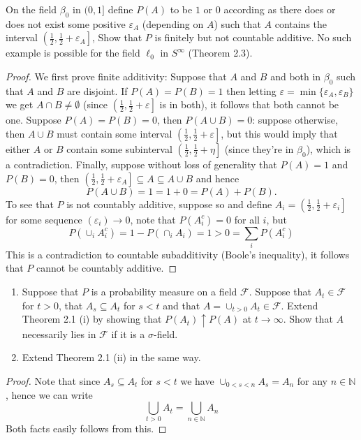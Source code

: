 \documentclass[11pt]{article}
\newcommand{\N}{\mathbb{N}}
\newcommand{\F}{\mathcal{F}}
\newcommand{\B}{\beta}
\newcommand{\seq}{\subseteq}
\newcommand{\e}{\varepsilon}
\newcommand{\es}{\emptyset}
\newcommand{\mc}{\mathcal}
\newcommand{\un}{\cup}
\newcommand{\ic}{\cap}
\newenvironment{exercise}[2][Exercise]{\begin{trivlist}
\item[\hskip \labelsep {\bfseries #1}\hskip \labelsep {\bfseries #2.}]}{\end{trivlist}}
\begin{document}
\begin{exercise}{2.15}
    On the field $\B_0$ in $(0, 1]$ define $P(A)$ to be $1$ or $0$ according as there does or does not exist some positive $\e_A$ (depending on $A$) such that $A$ contains the interval $\left ( \frac{1}{2}, \frac{1}{2} + \e_A \right ]$, Show that $P$ is finitely but not countable additive. No such example is possible for the field $\ell_0$ in $S^{\infty}$ (Theorem 2.3).
\end{exercise}
\begin{proof}
    We first prove finite additivity: Suppose that $A$ and $B$ and both in $\B_0$ such that $A$ and $B$ are disjoint. If $P(A) = P(B) = 1$ then letting $\e = \min \{ \e_A, \e_B \}$ we get $A \ic B \neq \es$ (since $\left ( \frac{1}{2}, \frac{1}{2} + \e \right ]$ is in both), it follows that both cannot be one. Suppose $P(A) = P(B) = 0$, then $P(A \un B) = 0$: suppose otherwise, then $A \un B$ must contain some interval $\left ( \frac{1}{2}, \frac{1}{2} + \e \right ]$, but this would imply that either $A$ or $B$ contain some subinterval $\left ( \frac{1}{2}, \frac{1}{2} + \eta \right ]$ (since they're in $\B_0$), which is a contradiction. Finally, suppose without loss of generality that $P(A) = 1$ and $P(B) = 0$, then $\left ( \frac{1}{2}, \frac{1}{2} + \e_A \right ] \seq A \seq A \un B$  and hence \[ P(A \un B) = 1 = 1 + 0 = P(A) + P(B). \]
    To see that $P$ is not countably additive, suppose so and define $A_i = \left (\frac{1}{2}, \frac{1}{2} + \e_i \right]$ for some sequence $(\e_i) \to 0$, note that $P(A_i^{c}) = 0$ for all $i$, but
    \[ P(\cup_i A_i^{c}) = 1 - P(\cap_i A_i) = 1 > 0 = \sum_{i} P(A_i^{c}) \]
    This is a contradiction to countable subadditivity (Boole's inequality), it follows that $P$ cannot be countably additive.
\end{proof}

\begin{exercise}{2.16}
    \begin{enumerate}
        \item Suppose that $P$ is a probability measure on a field $\F$. Suppose that $A_t \in \F$ for $t > 0$, that $A_s \subseteq A_t$ for $s < t$ and that $A = \cup_{t > 0} A_t \in \mc F$. Extend Theorem 2.1 (i) by showing that $P(A_t) \uparrow P(A)$ at $t \to \infty$. Show that $A$ necessarily lies in $\mc F$ if it is a $\sigma$-field.
        \item Extend Theorem 2.1 (ii) in the same way.
    \end{enumerate}
\end{exercise}
\begin{proof}
    Note that since $A_s \subseteq A_t$ for $s < t$ we have $\cup_{0 < s < n} A_s = A_n$ for any $n \in \N$, hence we can write
    \[ \bigcup_{t > 0} A_t = \bigcup_{n \in \N} A_n \]
    Both facts easily follows from this.
\end{proof}
\end{document}
